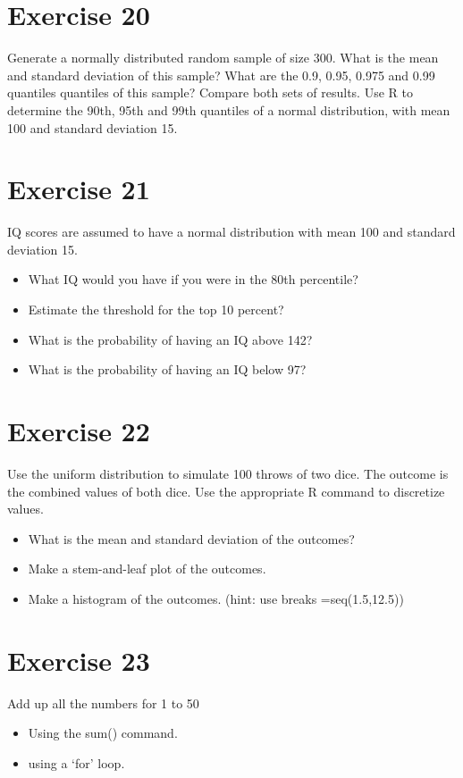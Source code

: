 \section*{Exercise 20}
 
Generate a normally distributed random sample of size 300. What is the mean and standard deviation of this sample? What are the 0.9, 0.95, 0.975 and 0.99 quantiles quantiles of this sample? Compare both sets of results.
Use R to determine the 90th, 95th and 99th quantiles of a normal distribution, with mean 100 and standard deviation 15.
 
\section*{Exercise 21}
IQ scores are assumed to have a normal distribution with mean 100 and standard deviation 15. 
 
\begin{itemize}
\item What IQ would you have if you were in the 80th percentile?
\item Estimate the threshold for the top 10 percent?
\item What is the probability of having an IQ above 142?
\item What is the probability of having an IQ below 97?
\end{itemize}
 
\section*{Exercise 22}
 
Use the uniform distribution to simulate 100 throws of two dice. The outcome is the combined values of both dice. Use the appropriate R command to discretize values.
\begin{itemize}
\item  What is the mean and standard deviation of the outcomes?
\item  Make a stem-and-leaf plot of the outcomes.
\item Make a histogram of the outcomes. (hint: use breaks =seq(1.5,12.5))
\end{itemize}
 
 
\section*{Exercise 23}

Add up all the numbers for 1 to 50
\begin{itemize}
\item  Using the sum() command.
\item  using a ‘for’ loop.
\end{itemize}
